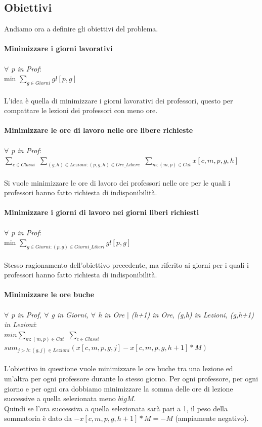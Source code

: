 \documentclass{article}
\begin{document}
\subsection{Obiettivi}
Andiamo ora a definire gli obiettivi del problema.
\\\\\textbf{Minimizzare i giorni lavorativi}
	\\\\\emph{$\forall$ p in Prof}:
	\\min $\sum_{g \in Giorni}gl[p,g]$
\\\\L'idea è quella di minimizzare i giorni lavorativi dei professori, questo per compattare le lezioni dei professori con meno ore.
\\\\\textbf{Minimizzare le ore di lavoro nelle ore libere richieste}
	\\\\\emph{$\forall$ p in Prof}:
	\\$\sum_{c \in Classi}$ $\sum_{(g,h) \in Lezioni : (p,g,h) \in Ore\_Libere}$ $\sum_{m : (m,p) \in Cat}x[c,m,p,g,h]$
\\\\Si vuole minimizzare le ore di lavoro dei professori nelle ore per le quali i professori hanno fatto richiesta di indisponibilità.
\\\\\textbf{Minimizzare i giorni di lavoro nei giorni liberi richiesti}
	\\\\\emph{$\forall$ p in Prof}:
	\\min $\sum_{g \in Giorni : (p,g) \in Giorni\_Liberi}gl[p,g]$
\\\\Stesso ragionamento dell'obiettivo precedente, ma riferito ai giorni per i quali i professori hanno fatto richiesta di indisponibilità.
\\\\\textbf{Minimizzare le ore buche}
	\\\\\emph{$\forall$ p in Prof, $\forall$ g in Giorni, $\forall$ h in Ore $\mid$ (h+1) in Ore, (g,h) in Lezioni, (g,h+1) in Lezioni}:
	\\$min \sum_{m : (m,p) \in Cat}$ $\sum_{c \in Classi}$ $sum_{j>h : (g,j) \in Lezioni}(x[c,m,p,g,j]-x[c,m,p,g,h+1]*M)$
\\\\L'obiettivo in questione vuole minimizzare le ore buche tra una lezione ed un'altra per ogni professore durante lo stesso giorno. Per ogni professore, per ogni giorno e per ogni ora dobbiamo minimizzare la somma delle ore di lezione successive a quella selezionata meno $bigM$.\\ Quindi se l'ora successiva a quella selezionata sarà pari a 1, il peso della sommatoria è dato da $- x[c,m,p,g,h+1]*M = - M$ (ampiamente negativo).
\end{document}
